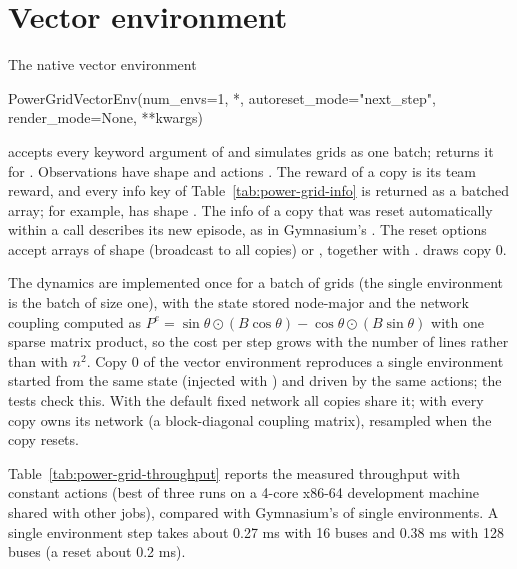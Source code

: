\section{Vector environment}\label{sec:power-grid-vector}

The native vector environment
\begin{pycode}
PowerGridVectorEnv(num_envs=1, *, autoreset_mode="next_step", render_mode=None, **kwargs)
\end{pycode}
accepts every keyword argument of  and simulates
 grids as one batch;  returns it for
. Observations have shape  and
actions . The reward of a copy is its team reward, and
every info key of Table~\ref{tab:power-grid-info} is returned as a batched array;
for example,  has shape . The
info of a copy that was reset automatically within a call describes its new
episode, as in Gymnasium's . The reset options accept
arrays of shape  (broadcast to all copies) or ,
together with .  draws copy 0.

The dynamics are implemented once for a batch of grids (the single
environment is the batch of size one), with the state stored node-major and
the network coupling computed as
$P^e = \sin\theta \odot (B\cos\theta) - \cos\theta \odot (B\sin\theta)$ with one
sparse matrix product, so the cost per step grows with the number of lines
rather than with $n^2$. Copy 0 of the vector environment reproduces a single
environment started from the same state (injected with )
and driven by the same actions; the tests check this. With the default fixed
network all copies share it; with  every copy owns
its network (a block-diagonal coupling matrix), resampled when the copy resets.

Table~\ref{tab:power-grid-throughput} reports the measured throughput with
constant actions (best of three runs on a 4-core x86-64 development machine
shared with other jobs), compared with Gymnasium's  of
single environments. A single environment step takes about 0.27 ms with 16 buses
and 0.38 ms with 128 buses (a reset about 0.2 ms).

